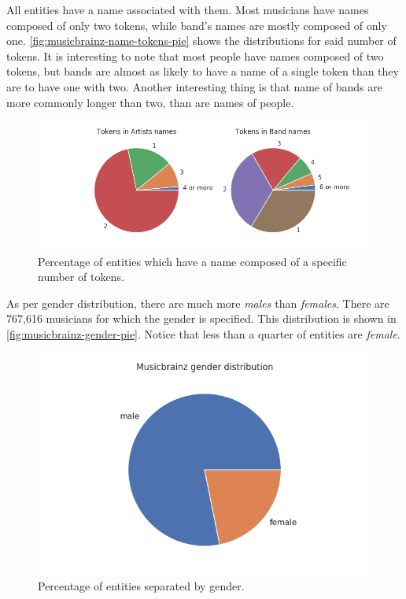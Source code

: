 \documentclass[epsfig,a4paper,11pt,titlepage,twoside,openany]{book}
\begin{document}
All entities have a name associated with them. Most musicians have names composed of only two tokens, while band's names are mostly composed of only one. \autoref{fig:musicbrainz-name-tokens-pie} shows the distributions for said number of tokens. It is interesting to note that most people have names composed of two tokens, but bands are almost as likely to have a name of a single token than they are to have one with two. Another interesting thing is that name of bands are more commonly longer than two, than are names of people.

\begin{figure}[]
  \centering \includegraphics[width=\textwidth]{musicbrainz_token_names_entities} 
  \caption{Percentage of entities which have a name composed of a specific number of tokens.}
  \label{fig:musicbrainz-name-tokens-pie}
\end{figure}

As per gender distribution, there are much more \textit{males} than \textit{females}. There are 767,616 musicians for which the gender is specified. This distribution is shown in \autoref{fig:musicbrainz-gender-pie}. Notice that less than a quarter of entities are \textit{female}.

\begin{figure}[]
  \centering \includegraphics[width=\textwidth]{musicbrainz_gender_pieplot} 
  \caption{Percentage of entities separated by gender.}
  \label{fig:musicbrainz-gender-pie}
\end{figure}
\end{document}
